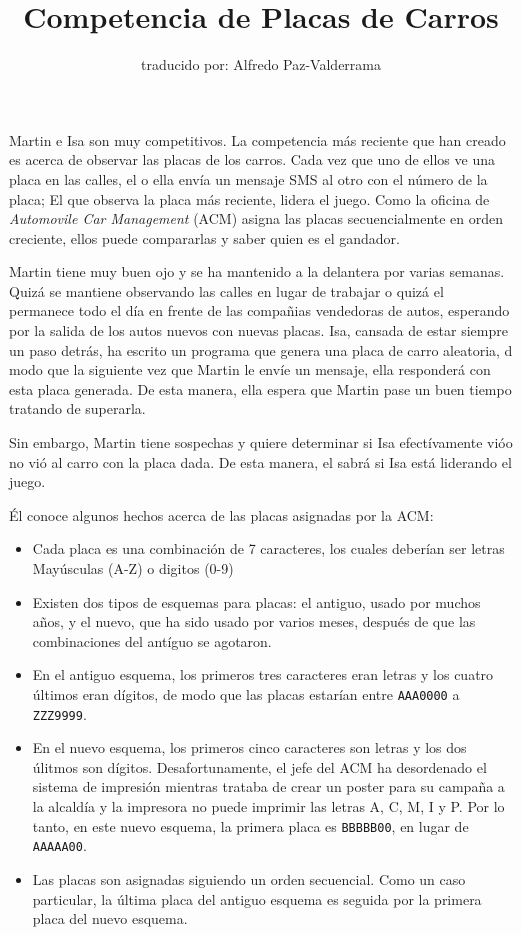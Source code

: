 \documentclass[a4paper,10pt]{article}
\title{Competencia de Placas de Carros}
\author{traducido por: Alfredo Paz-Valderrama}
\date{}
\begin{document}
\maketitle
Martin e Isa son muy competitivos. La competencia más reciente que han creado es acerca de observar las placas de los carros. Cada vez que uno de ellos ve una placa en las calles, el o ella envía un mensaje SMS al otro con el número de la placa; El que observa la placa más reciente, lidera el juego. Como la oficina de \emph{Automovile Car Management} (ACM) asigna las placas secuencialmente en orden creciente, ellos puede compararlas y saber quien es el gandador.

Martin tiene muy buen ojo y se ha mantenido a la delantera por varias semanas.  Quizá se mantiene observando las calles en lugar de trabajar o quizá el permanece todo el día en frente de las compañias vendedoras de autos, esperando por la salida de los autos nuevos con nuevas placas.  Isa, cansada de estar siempre un paso detrás, ha escrito un programa que genera una placa de carro aleatoria, d modo que la siguiente vez que Martin le envíe un mensaje, ella responderá con esta placa generada. De esta manera, ella espera que Martin pase un buen tiempo tratando de superarla.

Sin embargo, Martin tiene sospechas y quiere determinar si Isa efectívamente vióo no vió al carro con la placa dada. De esta manera, el sabrá si Isa está liderando el juego.

Él conoce algunos hechos acerca de las placas asignadas por la ACM:

\begin{itemize}
   \item Cada placa es una combinación de 7 caracteres, los cuales deberían ser letras Mayúsculas (A-Z) o digitos (0-9)
   \item Existen dos tipos de esquemas para placas: el antiguo, usado por muchos años, y el nuevo, que ha sido usado por varios meses, después de que las combinaciones del antíguo se agotaron.
  \item En el antiguo esquema, los primeros tres caracteres eran letras y los cuatro últimos eran dígitos, de modo que las placas estarían entre \verb|AAA0000| a \verb|ZZZ9999|.
  \item En el nuevo esquema, los primeros cinco caracteres son letras y los dos úlitmos son dígitos. Desafortunamente, el jefe del ACM ha desordenado el sistema de impresión mientras trataba de crear un poster para su campaña a la alcaldía y la impresora no puede imprimir las letras A, C, M, I y P. Por lo tanto, en este nuevo esquema, la primera placa es \verb|BBBBB00|, en lugar de \verb|AAAAA00|.
  \item Las placas son asignadas siguiendo un orden secuencial. Como un caso particular, la última placa del antiguo esquema es seguida por la primera placa del nuevo esquema.
\end{itemize}
\end{document}
